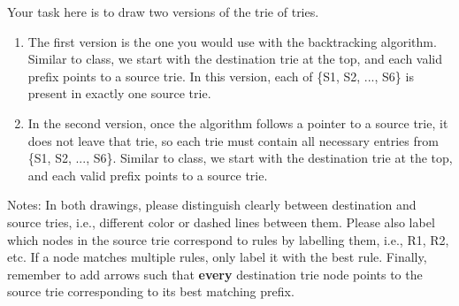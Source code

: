 \documentclass[10pt]{article}
\newenvironment{problem}[2][Problem]{\begin{trivlist}
\item[\hskip \labelsep {\bfseries #1}\hskip \labelsep {\bfseries #2.}]}{\end{trivlist}}
\begin{document}
\begin{problem}{2: Building a Firewall}
\begin{enumerate}
Your task here is to draw two versions of the trie of tries. 
\begin{enumerate}
    \item The first version is the one you would use with the backtracking algorithm. Similar to class, we start with the destination trie at the top, and each valid prefix points to a source trie. In this version, each of \{S1, S2, ..., S6\} is present in exactly one source trie.
    \item In the second version, once the algorithm follows a pointer to a source trie, it does not leave that trie, so each trie must contain all necessary entries from \{S1, S2, ..., S6\}. Similar to class, we start with the destination trie at the top, and each valid prefix points to a source trie. 
\end{enumerate}
Notes: In both drawings, please distinguish clearly between destination and source tries, i.e., different color or dashed lines between them. Please also label which nodes in the source trie correspond to rules by labelling them, i.e., R1, R2, etc. If a node matches multiple rules, only label it with the best rule. Finally, remember to add arrows such that \textbf{every} destination trie node points to the source trie corresponding to its best matching prefix.
\end{enumerate}
\end{problem}
\end{document}
